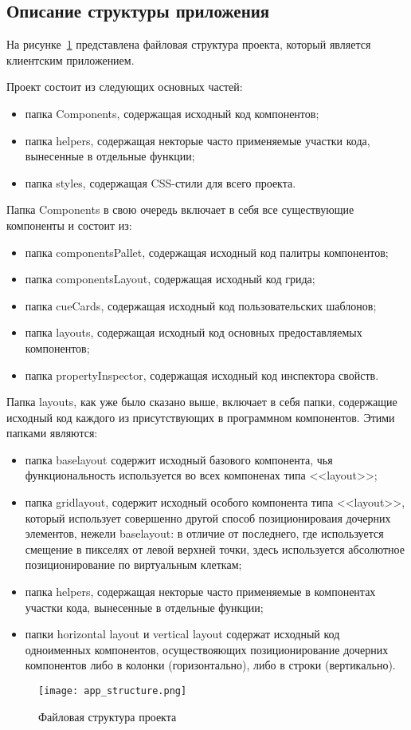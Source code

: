 \subsection{Описание структуры приложения}
\label{sec:development:app_structure}

На рисунке~\ref{sec:development:app_structure_pic} представлена файловая структура проекта, который является клиентским приложением.

Проект состоит из следующих основных частей:

\begin{itemize}
    \item папка Components, содержащая исходный код компонентов;
    \item папка helpers, содержащая некторые часто применяемые участки кода, вынесенные в отдельные функции;
    \item папка styles, содержащая CSS-стили для всего проекта.
\end{itemize}

Папка Components в свою очередь включает в себя все существующие компоненты и состоит из:

\begin{itemize}
    \item папка componentsPallet, содержащая исходный код палитры компонентов;
    \item папка componentsLayout, содержащая исходный код грида;
    \item папка cueCards, содержащая исходный код пользовательских шаблонов;
    \item папка layouts, содержащая исходный код основных предоставляемых компонентов;
    \item папка propertyInspector, содержащая исходный код инспектора свойств.
\end{itemize}

Папка layouts, как уже было сказано выше, включает в себя папки, содержащие исходный код каждого из присутствующих в программном компонентов. Этими папками являются:

\begin{itemize}
    \item папка baselayout содержит исходный базового компонента, чья функциональность используется во всех компоненах типа <<layout>>;
    \item папка gridlayout, содержит исходный особого компонента типа <<layout>>, который использует совершенно другой способ позиционироваия дочерних элементов, нежели baselayout: в отличие от последнего, где используется смещение в пикселях от левой верхней точки, здесь используется абсолютное позиционирование по виртуальным клеткам;
    \item папка helpers, содержащая некторые часто применяемые в компонентах участки кода, вынесенные в отдельные функции;
    \item папки horizontal layout и vertical layout содержат исходный код одноименных компонентов, осуществояющих позиционирование дочерних компонентов либо в колонки (горизонтально), либо в строки (вертикально).
\end{itemize}

\begin{figure}[ht]
\centering
    \texttt{[image: app\_structure.png]}
    \caption{Файловая структура проекта}
    \label{sec:development:app_structure_pic}
\end{figure}
    